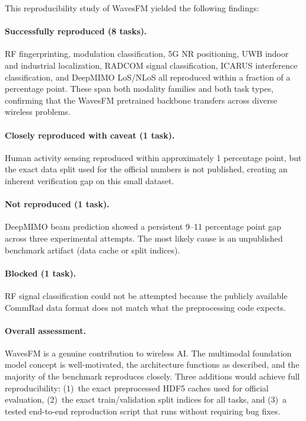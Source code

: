 \documentclass[11pt]{article}
\begin{document}
This reproducibility study of WavesFM yielded the following findings:

\paragraph{Successfully reproduced (8 tasks).} RF fingerprinting, modulation classification, 5G NR positioning, UWB indoor and industrial localization, RADCOM signal classification, ICARUS interference classification, and DeepMIMO LoS/NLoS all reproduced within a fraction of a percentage point. These span both modality families and both task types, confirming that the WavesFM pretrained backbone transfers across diverse wireless problems.

\paragraph{Closely reproduced with caveat (1 task).} Human activity sensing reproduced within approximately 1 percentage point, but the exact data split used for the official numbers is not published, creating an inherent verification gap on this small dataset.

\paragraph{Not reproduced (1 task).} DeepMIMO beam prediction showed a persistent 9--11 percentage point gap across three experimental attempts. The most likely cause is an unpublished benchmark artifact (data cache or split indices).

\paragraph{Blocked (1 task).} RF signal classification could not be attempted because the publicly available CommRad data format does not match what the preprocessing code expects.

\paragraph{Overall assessment.} WavesFM is a genuine contribution to wireless AI. The multimodal foundation model concept is well-motivated, the architecture functions as described, and the majority of the benchmark reproduces closely. Three additions would achieve full reproducibility: (1)~the exact preprocessed HDF5 caches used for official evaluation, (2)~the exact train/validation split indices for all tasks, and (3)~a tested end-to-end reproduction script that runs without requiring bug fixes.
\end{document}
